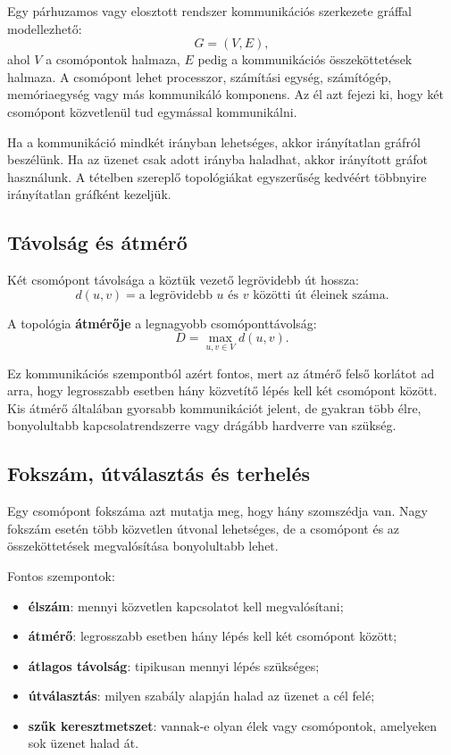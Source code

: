 Egy párhuzamos vagy elosztott rendszer kommunikációs szerkezete gráffal modellezhető:
\[
  G=(V,E),
\]
ahol $V$ a csomópontok halmaza, $E$ pedig a kommunikációs összeköttetések halmaza. A csomópont lehet processzor, számítási egység, számítógép, memóriaegység vagy más kommunikáló komponens. Az él azt fejezi ki, hogy két csomópont közvetlenül tud egymással kommunikálni.

Ha a kommunikáció mindkét irányban lehetséges, akkor irányítatlan gráfról beszélünk. Ha az üzenet csak adott irányba haladhat, akkor irányított gráfot használunk. A tételben szereplő topológiákat egyszerűség kedvéért többnyire irányítatlan gráfként kezeljük.

\subsection{Távolság és átmérő}

Két csomópont távolsága a köztük vezető legrövidebb út hossza:
\[
  d(u,v)=\text{a legrövidebb }u\text{ és }v\text{ közötti út éleinek száma}.
\]

A topológia \textbf{átmérője} a legnagyobb csomóponttávolság:
\[
  D=\max_{u,v\in V} d(u,v).
\]

Ez kommunikációs szempontból azért fontos, mert az átmérő felső korlátot ad arra, hogy legrosszabb esetben hány közvetítő lépés kell két csomópont között. Kis átmérő általában gyorsabb kommunikációt jelent, de gyakran több élre, bonyolultabb kapcsolatrendszerre vagy drágább hardverre van szükség.

\subsection{Fokszám, útválasztás és terhelés}

Egy csomópont fokszáma azt mutatja meg, hogy hány szomszédja van. Nagy fokszám esetén több közvetlen útvonal lehetséges, de a csomópont és az összeköttetések megvalósítása bonyolultabb lehet.

Fontos szempontok:

\begin{itemize}
  \item \textbf{élszám}: mennyi közvetlen kapcsolatot kell megvalósítani;
  \item \textbf{átmérő}: legrosszabb esetben hány lépés kell két csomópont között;
  \item \textbf{átlagos távolság}: tipikusan mennyi lépés szükséges;
  \item \textbf{útválasztás}: milyen szabály alapján halad az üzenet a cél felé;
  \item \textbf{szűk keresztmetszet}: vannak-e olyan élek vagy csomópontok, amelyeken sok üzenet halad át.
\end{itemize}

